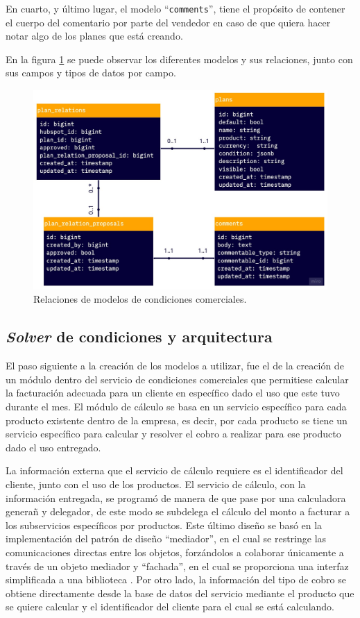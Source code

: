     En cuarto, y último lugar, el modelo ``\texttt{comments}'', tiene el propósito de contener el cuerpo del comentario por parte del vendedor en caso de que quiera hacer notar algo de los planes que está creando.

    En la figura \ref{fig:cc_relations} se puede observar los diferentes modelos y sus relaciones, junto con sus campos y tipos de datos por campo.
    
    \begin{figure}
      \centering
      \includegraphics[width=0.75\linewidth]{figures/cc/cc_relations.jpg}
      \caption{Relaciones de modelos de condiciones comerciales.}
      \label{fig:cc_relations}
    \end{figure}

  \subsection{\textit{Solver} de condiciones y arquitectura}
    \label{solver_y_arquitectura}

    El paso siguiente a la creación de los modelos a utilizar, fue el de la creación de un módulo dentro del servicio de condiciones comerciales  que permitiese calcular la facturación adecuada para un cliente en específico dado el uso que este tuvo durante el mes. El módulo de cálculo se basa en un servicio específico para cada producto existente dentro de la empresa, es decir, por cada producto se tiene un servicio específico para calcular y resolver el cobro a realizar para ese producto dado el uso entregado.

    La información externa que el servicio de cálculo requiere es el identificador del cliente, junto con el uso de los productos. El servicio de cálculo, con la información entregada, se programó de manera de que pase por una calculadora generañ y delegador, de este modo se subdelega el cálculo del monto a facturar a los subservicios específicos por productos. Este último diseño se basó en la implementación del patrón de diseño ``mediador'', en el cual se restringe las comunicaciones directas entre los objetos, forzándolos a colaborar únicamente a través de un objeto mediador \cite{pattern_mediator} y ``fachada'', en el cual se proporciona una interfaz simplificada a una biblioteca \cite{pattern_facade}. Por otro lado, la información del tipo de cobro se obtiene directamente desde la base de datos del servicio mediante el producto que se quiere calcular y el identificador del cliente para el cual se está calculando.
    

